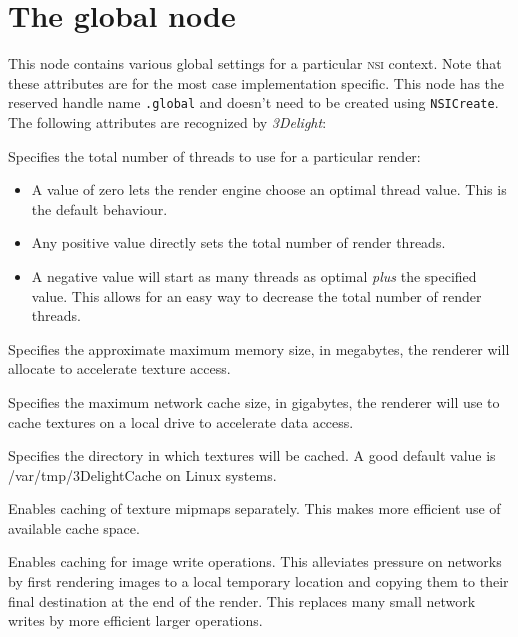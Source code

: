 \documentclass[oneside,ebook]{memoir}
\newcommand*{\acronym}[1]{\textsc{\lowercase{#1}}}
\newcommand{\paramlistitemTN}[2]{\item[#2\textcolor{lightgray}{\dotfill}#1]}
\newcommand{\paramlistitemTND}[3]{\paramlistitemTN{#1 {\rmfamily({\ttfamily#3})}}{#2}}
\begin{document}
\section{The global node}
\label{section:globalnode}
This node contains various global settings for a particular \acronym{nsi} context.
Note that these attributes are for the most case implementation specific.
This node has the reserved handle name \lstinline|.global| and doesn't need to be created using \lstinline|NSICreate|. The following attributes are recognized by \textit{3Delight}:
\begin{paramlist}
\paramlistitemTND{int}{numberofthreads}{0} 
Specifies the total number of threads to use for a particular render:
\begin{itemize}
\item A value of zero lets the render engine choose an optimal thread value. This is the default behaviour.
\item Any positive value directly sets the total number of render threads.
\item A negative value will start as many threads as optimal \textit{plus} the specified value. This allows for an easy way to decrease the total number of render threads.
\end{itemize}
\paramlistitemTN{int}{texturememory}
Specifies the approximate maximum memory size, in megabytes, the renderer will allocate to accelerate texture access.
\paramlistitemTND{int}{networkcache.size}{0}
Specifies the maximum network cache size, in gigabytes, the renderer will use to cache textures on a local drive to accelerate data access.
\paramlistitemTN{string}{networkcache.directory}
Specifies the directory in which textures will be cached. A good default value is /var/tmp/3DelightCache on Linux systems.
\paramlistitemTND{int}{networkcache.mipmap}{1}
Enables caching of texture mipmaps separately. This makes more efficient use of available cache space.
\paramlistitemTND{string}{networkcache.write}{0}
Enables caching for image write operations. This alleviates pressure on networks by first rendering images to a local temporary location and copying them to their final destination at the end of the render. This replaces many small network writes by more efficient larger operations.

\end{paramlist}
\end{document}
